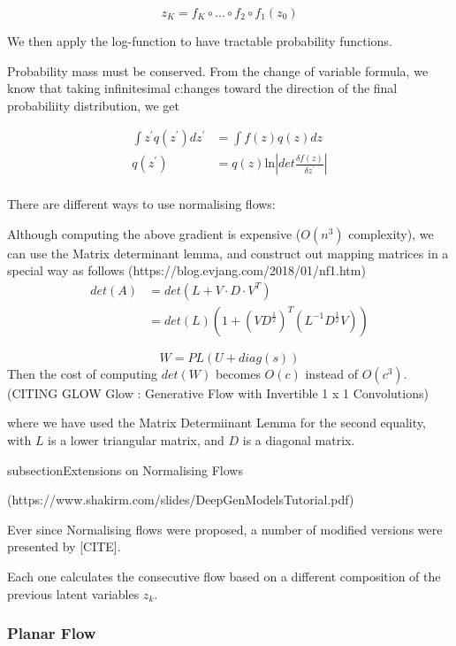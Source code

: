 \documentclass[a4paper,12pt,twoside,openright]{report}
\begin{document}
\begin{equation}
z_K = f_K \circ \ldots \circ f_2 \circ f_1 (z_0)
\end{equation}

We then apply the log-function to have tractable probability functions.

Probability mass must be conserved.
From the change of variable formula, we know that taking infinitesimal c:hanges toward the direction of the final probabiliity distribution, we get

\begin{align}
\int z^\prime q(z^\prime) dz^\prime &= \int f(z) q(z) dz \\
q(z^\prime) &= q(z) \text{ln} \left| det \frac{\delta f(z)}{\delta z^\prime} \right|
\end{align} \\

There are different ways to use normalising flows:

Although computing the above gradient is expensive ($O(n^3)$ complexity), we can use the Matrix determinant lemma, and construct out mapping matrices in a special way as follows
(https://blog.evjang.com/2018/01/nf1.htm)\\

\begin{align}
det(A) & = det(L + V \cdot D \cdot V^T) \\
		& = det(L) (1 + (VD^{\frac{1}{2}})^T (L^{-1} D^{\frac{1}{2}}V))
\end{align}

\begin{equation}
W = PL (U + diag(s))
\end{equation}
Then the cost of computing $det(W)$ becomes $O(c)$ instead of $O(c^3)$.
(CITING GLOW Glow : Generative Flow with Invertible 1 x 1 Convolutions)

where we have used the Matrix Determiinant Lemma for the second equality, with $L$ is a lower triangular matrix, and $D$ is a diagonal matrix.


subsection{Extensions on Normalising Flows}

(https://www.shakirm.com/slides/DeepGenModelsTutorial.pdf)

Ever since Normalising flows were proposed, a number of modified versions were presented by [CITE].

Each one calculates the consecutive flow based on a different composition of the previous latent variables $z_k$.

\subsubsection{Planar Flow}
\end{document}
